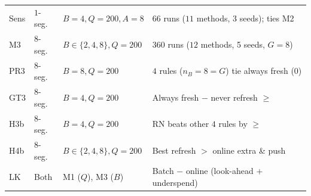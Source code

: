 \begin{table}[!t]
\begin{tabular}{@{}llll@{}}
Sens & $1$-seg. & $B{=}4, Q{=}200, A{=}8$ & $66$ runs ($11$ methods, $3$ seeds); ties M2 \\
M3 & $8$-seg. & $B{\in}\{2,4,8\}, Q{=}200$ & $360$ runs ($12$ methods, 5 seeds, $G{=}8$) \\
\hspace{1mm}PR3 & $8$-seg. & $B{=}8, Q{=}200$ & $4$ rules ($n_B{=}8{=}G$) tie always fresh ($0$) \\
\hspace{1mm}GT3 & $8$-seg. & $B{=}4, Q{=}200$ & Always fresh $-$ never refresh $\ge {}$\RNumGateThresholdPP{} \\
\hspace{1mm}H3b & $8$-seg. & $B{=}4, Q{=}200$ & RN beats other $4$ rules by $\ge {}$\RNumGateThresholdPP{} \\
\hspace{1mm}H4b & $8$-seg. & $B{\in}\{2,4,8\}, Q{=}200$ & Best refresh $>$ online extra \& push \\
\hspace{1mm}LK & Both & M1 ($Q$), M3 ($B$) & Batch $-$ online (look-ahead $+$ underspend) \\
\bottomrule
\end{tabular}
\end{table}

